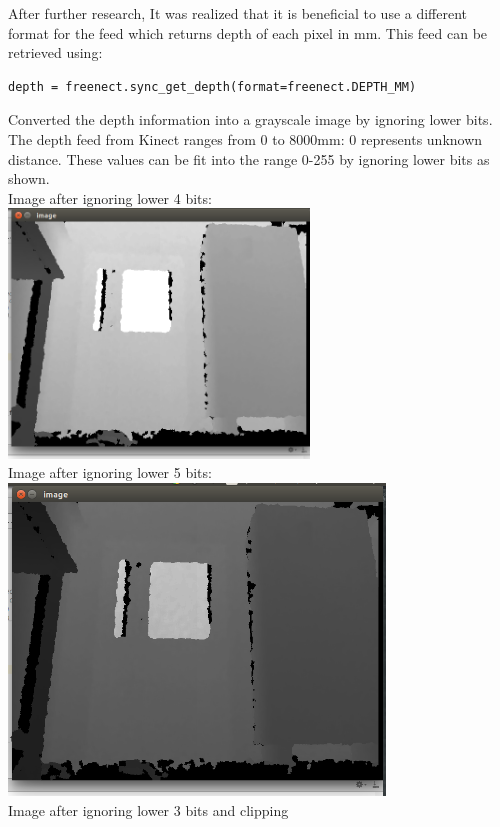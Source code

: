 \documentclass{report}
\begin{document}
After further research, It was realized that it is beneficial to use a different format for the feed which returns depth of each pixel 
in mm. This feed can be retrieved using: \\

\begin{lstlisting}
depth = freenect.sync_get_depth(format=freenect.DEPTH_MM)
\end{lstlisting}

Converted the depth information into a grayscale image by ignoring lower bits. The depth feed from Kinect ranges from 0 to 8000mm: 0 represents unknown distance. These values can be fit into the range 0-255 by ignoring lower bits as shown. 
\\
Image after ignoring lower 4 bits: \\
\includegraphics[width = 8cm]{d_4bit.png} \\
Image after ignoring lower 5 bits: \\
\includegraphics[width = 10cm]{d_5bit.png} \\
Image after ignoring lower 3 bits and clipping \\
\end{document}
